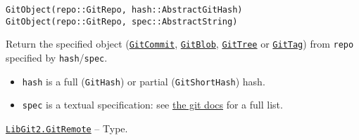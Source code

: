 \begin{adjustwidth}{2em}{0pt}


\begin{verbatim}
GitObject(repo::GitRepo, hash::AbstractGitHash)
GitObject(repo::GitRepo, spec::AbstractString)
\end{verbatim}

Return the specified object (\hyperlink{5346527129202716606}{\texttt{GitCommit}}, \hyperlink{13272891135715880949}{\texttt{GitBlob}}, \hyperlink{6242150303858692069}{\texttt{GitTree}} or \hyperlink{10467695058580020738}{\texttt{GitTag}}) from \texttt{repo} specified by \texttt{hash}/\texttt{spec}.

\begin{itemize}
\item \texttt{hash} is a full (\texttt{GitHash}) or partial (\texttt{GitShortHash}) hash.


\item \texttt{spec} is a textual specification: see \href{https://git-scm.com/docs/git-rev-parse.html\#\_specifying\_revisions}{the git docs} for a full list.

\end{itemize}


\end{adjustwidth}
\hypertarget{9925970107179782013}{}
\hyperlink{9925970107179782013}{\texttt{LibGit2.GitRemote}}  -- {Type.}

